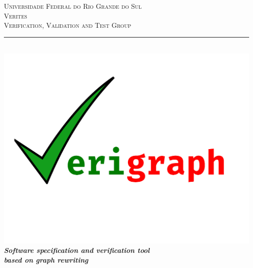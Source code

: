 \documentclass[12pt]{article}
\begin{document}
\begin{titlepage}

\newcommand{\HRule}{\rule{\linewidth}{0.5mm}} %

\center %
 

\textsc{\normalsize Universidade Federal do Rio Grande do Sul}\\[1.0cm] %
\textsc{\Large Verites}\\[0.2cm] %
\textsc{\large Verification, Validation and Test Group}\\[0.2cm] %


\HRule \\[0.4cm]
{ %
\includegraphics[scale = 0.2]{img/logos/Verigraph}\\
\huge \bfseries \emph{\large{Software specification and verification tool\\based on graph rewriting}}
}\\[0.5cm]


\end{titlepage}
\end{document}
